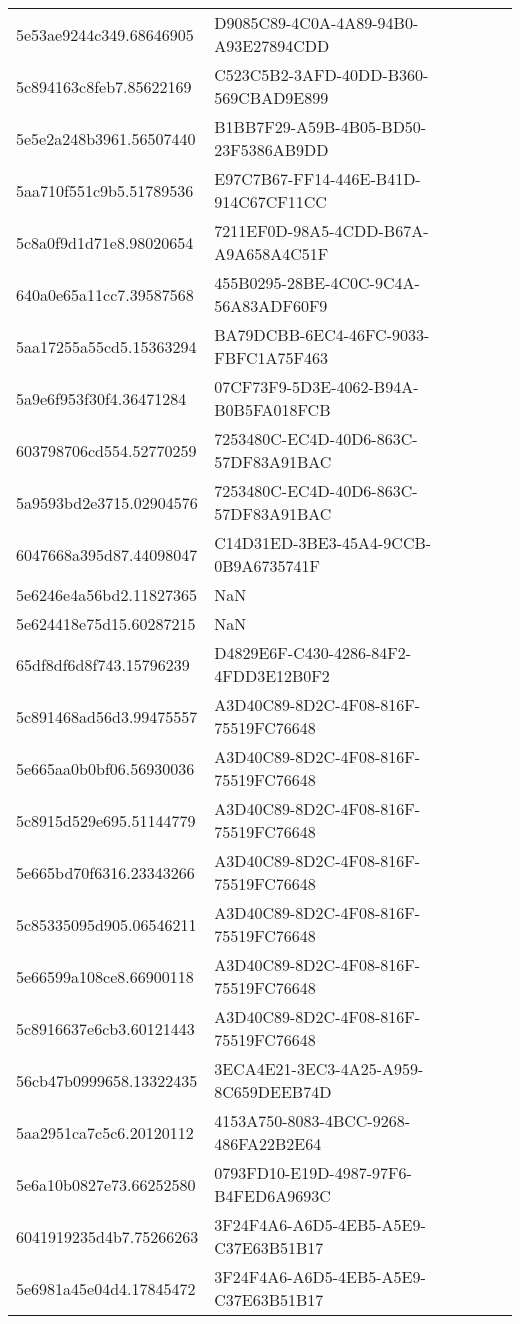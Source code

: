 \begin{tabular}{ll}
5e53ae9244c349.68646905 & D9085C89-4C0A-4A89-94B0-A93E27894CDD \\
5c894163c8feb7.85622169 & C523C5B2-3AFD-40DD-B360-569CBAD9E899 \\
5e5e2a248b3961.56507440 & B1BB7F29-A59B-4B05-BD50-23F5386AB9DD \\
5aa710f551c9b5.51789536 & E97C7B67-FF14-446E-B41D-914C67CF11CC \\
5c8a0f9d1d71e8.98020654 & 7211EF0D-98A5-4CDD-B67A-A9A658A4C51F \\
640a0e65a11cc7.39587568 & 455B0295-28BE-4C0C-9C4A-56A83ADF60F9 \\
5aa17255a55cd5.15363294 & BA79DCBB-6EC4-46FC-9033-FBFC1A75F463 \\
5a9e6f953f30f4.36471284 & 07CF73F9-5D3E-4062-B94A-B0B5FA018FCB \\
603798706cd554.52770259 & 7253480C-EC4D-40D6-863C-57DF83A91BAC \\
5a9593bd2e3715.02904576 & 7253480C-EC4D-40D6-863C-57DF83A91BAC \\
6047668a395d87.44098047 & C14D31ED-3BE3-45A4-9CCB-0B9A6735741F \\
5e6246e4a56bd2.11827365 & NaN \\
5e624418e75d15.60287215 & NaN \\
65df8df6d8f743.15796239 & D4829E6F-C430-4286-84F2-4FDD3E12B0F2 \\
5c891468ad56d3.99475557 & A3D40C89-8D2C-4F08-816F-75519FC76648 \\
5e665aa0b0bf06.56930036 & A3D40C89-8D2C-4F08-816F-75519FC76648 \\
5c8915d529e695.51144779 & A3D40C89-8D2C-4F08-816F-75519FC76648 \\
5e665bd70f6316.23343266 & A3D40C89-8D2C-4F08-816F-75519FC76648 \\
5c85335095d905.06546211 & A3D40C89-8D2C-4F08-816F-75519FC76648 \\
5e66599a108ce8.66900118 & A3D40C89-8D2C-4F08-816F-75519FC76648 \\
5c8916637e6cb3.60121443 & A3D40C89-8D2C-4F08-816F-75519FC76648 \\
56cb47b0999658.13322435 & 3ECA4E21-3EC3-4A25-A959-8C659DEEB74D \\
5aa2951ca7c5c6.20120112 & 4153A750-8083-4BCC-9268-486FA22B2E64 \\
5e6a10b0827e73.66252580 & 0793FD10-E19D-4987-97F6-B4FED6A9693C \\
6041919235d4b7.75266263 & 3F24F4A6-A6D5-4EB5-A5E9-C37E63B51B17 \\
5e6981a45e04d4.17845472 & 3F24F4A6-A6D5-4EB5-A5E9-C37E63B51B17 \\

\end{tabular}
